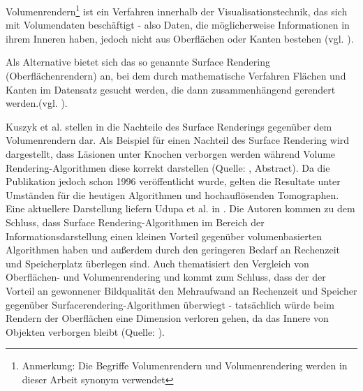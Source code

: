 \documentclass[pdftex,a4paper,titlepage,12pt]{scrartcl}
\newtheorem[L]{boxedDefinition}{Definition}
\begin{document}
Volumenrendern\footnote{Anmerkung: Die Begriffe Volumenrendern und Volumenrendering werden in dieser Arbeit synonym verwendet} ist ein Verfahren innerhalb der Visualisationstechnik, das sich mit Volumendaten beschäftigt - also Daten, die möglicherweise Informationen in ihrem Inneren haben, jedoch nicht aus Oberflächen oder Kanten bestehen (vgl. \cite[Kapitel 1, Seite 2]{Bruckner2004}).

Als Alternative bietet sich das so genannte Surface Rendering (\glqq Oberflächenrendern\grqq) an, bei dem durch mathematische Verfahren Flächen und Kanten im Datensatz gesucht werden, die dann zusammenhängend gerendert werden.(vgl. \cite[Kapitel 1, Seite 2f.]{Bruckner2004}).

Kuszyk et al. stellen in \cite{Kuszyk1996} die Nachteile des Surface Renderings gegenüber dem Volumenrendern dar. Als Beispiel für einen Nachteil des Surface Rendering wird dargestellt, dass Läsionen unter Knochen verborgen werden während Volume Rendering-Algorithmen diese korrekt darstellen (Quelle: \cite{Kuszyk1996}, Abstract). Da die Publikation jedoch schon 1996 veröffentlicht wurde, gelten die Resultate unter Umständen für die heutigen Algorithmen und hochauflösenden Tomographen. Eine aktuellere Darstellung liefern Udupa et al. in \cite{Udupa2009}. Die Autoren kommen zu dem Schluss, dass Surface Rendering-Algorithmen im Bereich der Informationsdarstellung einen kleinen Vorteil gegenüber volumenbasierten Algorithmen haben und außerdem durch den geringeren Bedarf an Rechenzeit und Speicherplatz überlegen sind. Auch \cite{Bruckner2004} thematisiert den Vergleich von Oberflächen- und Volumenrendering und kommt zum Schluss, dass  der der Vorteil an gewonnener Bildqualität den Mehraufwand an Rechenzeit und Speicher gegenüber Surfacerendering-Algorithmen überwiegt - tatsächlich würde beim Rendern der Oberflächen eine Dimension verloren gehen, da das Innere von Objekten verborgen bleibt (Quelle: \cite[Seite 2f.]{Bruckner2004}).
\end{document}
